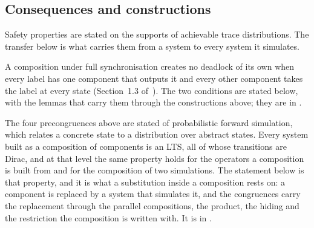 \subsection{Consequences and constructions}

Safety properties are stated on the supports of achievable trace distributions.
The transfer below is what carries them from a system to every system it simulates.











A composition under full synchronisation creates no deadlock of its own when every label has one component that outputs it and every other component takes the label at every state (Section~1.3 of~\cite{LeslieBP}).
The two conditions are stated below, with the lemmas that carry them through the constructions above; they are in .

















The four precongruences above are stated of probabilistic forward simulation, which relates a concrete state to a distribution over abstract states.
Every system built as a composition of components is an LTS, all of whose transitions are Dirac, and at that level the same property holds for the operators a composition is built from and for the composition of two simulations.
The statement below is that property, and it is what a substitution inside a composition rests on: a component is replaced by a system that simulates it, and the congruences carry the replacement through the parallel compositions, the product, the hiding and the restriction the composition is written with.
It is in .

